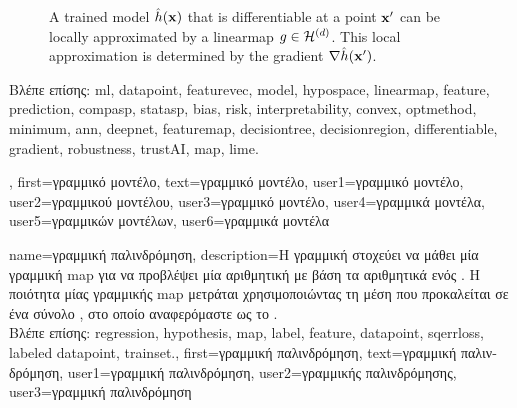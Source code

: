 {{\begin{figure}[H]
\begin{center}
\begin{tikzpicture}[x=0.5cm]
		\end{tikzpicture}
		\vspace*{-5mm}
		\end{center}
		\caption{A trained \gls{model} $\learnthypothesis(\featurevec)$ that is \gls{differentiable} at a point $\featurevec'$ 
		can be locally approximated by a \gls{linearmap} $g \in \linmodel{\nrfeatures}$. This local approximation 
		is determined by the \gls{gradient} $\nabla \learnthypothesis(\featurevec')$.}
		\label{fig_linapprox_dict}
		\end{figure}
		\foreignlanguage{greek}{Βλέπε επίσης:} \gls{ml}, \gls{datapoint}, \gls{featurevec}, \gls{model}, \gls{hypospace}, \gls{linearmap}, \gls{feature}, 
		\gls{prediction}, \gls{compasp}, \gls{statasp}, \gls{bias}, \gls{risk}, \gls{interpretability}, \gls{convex}, \gls{optmethod}, \gls{minimum}, \gls{ann}, 
		\gls{deepnet}, \gls{featuremap}, \gls{decisiontree}, \gls{decisionregion}, \gls{differentiable}, \gls{gradient}, \gls{robustness}, \gls{trustAI}, \gls{map}, \gls{lime}.}, 
	first={\foreignlanguage{greek}{γραμμικό μοντέλο}},
   	text={\foreignlanguage{greek}{γραμμικό μοντέλο}},
   	user1={\foreignlanguage{greek}{γραμμικό μοντέλο}}, %
   	user2={\foreignlanguage{greek}{γραμμικού μοντέλου}}, %
   	user3={\foreignlanguage{greek}{γραμμικό μοντέλο}}, %
   	user4={\foreignlanguage{greek}{γραμμικά μοντέλα}}, %
   	user5={\foreignlanguage{greek}{γραμμικών μοντέλων}}, %
   	user6={\foreignlanguage{greek}{γραμμικά μοντέλα}} %
}

{name={\foreignlanguage{greek}{γραμμική παλινδρόμηση}}, 
	description={\foreignlanguage{greek}{Η γραμμική} 
		 \foreignlanguage{greek}{στοχεύει να μάθει μία γραμμική} \gls{map}  
		\foreignlanguage{greek}{για να προβλέψει μία αριθμητική}  \foreignlanguage{greek}{με βάση τα αριθμητικά} 
		 \foreignlanguage{greek}{ενός} . \foreignlanguage{greek}{Η ποιότητα μίας γραμμικής} 
		\gls{map}  \foreignlanguage{greek}{μετράται χρησιμοποιώντας τη μέση}  
		 \foreignlanguage{greek}{που προκαλείται σε ένα σύνολο} , 
		\foreignlanguage{greek}{στο οποίο αναφερόμαστε ως το} .\\
		\foreignlanguage{greek}{Βλέπε επίσης:} \gls{regression}, \gls{hypothesis}, \gls{map}, \gls{label}, \gls{feature}, \gls{datapoint},  \gls{sqerrloss}, 
		\gls{labeled datapoint}, \gls{trainset}.},
	first={\foreignlanguage{greek}{γραμμική παλινδρόμηση}},
	text={\foreignlanguage{greek}{γραμμική παλινδρόμηση}},
	user1={\foreignlanguage{greek}{γραμμική παλινδρόμηση}}, %
	user2={\foreignlanguage{greek}{γραμμικής παλινδρόμησης}}, %
	user3={\foreignlanguage{greek}{γραμμική παλινδρόμηση}} %
}

